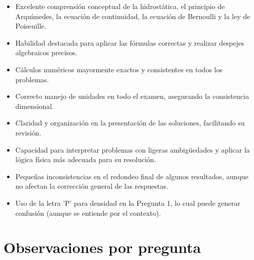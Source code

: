 \documentclass[11pt,a4paper]{article}
\begin{document}
\vspace{4pt}
\begin{minipage}[t]{0.48\linewidth}
  \begin{tcolorbox}[cajaFortaleza, title={Fortalezas}]
\begin{itemize}[leftmargin=1.5em, itemsep=2pt]
  \item Excelente comprensión conceptual de la hidrostática, el principio de Arquímedes, la ecuación de continuidad, la ecuación de Bernoulli y la ley de Poiseuille.
  \item Habilidad destacada para aplicar las fórmulas correctas y realizar despejes algebraicos precisos.
  \item Cálculos numéricos mayormente exactos y consistentes en todos los problemas.
  \item Correcto manejo de unidades en todo el examen, asegurando la consistencia dimensional.
  \item Claridad y organización en la presentación de las soluciones, facilitando su revisión.
  \item Capacidad para interpretar problemas con ligeras ambigüedades y aplicar la lógica física más adecuada para su resolución.
\end{itemize}
  \end{tcolorbox}
\end{minipage}
\hfill
\begin{minipage}[t]{0.48\linewidth}
  \begin{tcolorbox}[cajaMejora, title={Areas de mejora}]
\begin{itemize}[leftmargin=1.5em, itemsep=2pt]
  \item Pequeñas inconsistencias en el redondeo final de algunos resultados, aunque no afectan la corrección general de las respuestas.
  \item Uso de la letra 'P' para densidad en la Pregunta 1, lo cual puede generar confusión (aunque se entiende por el contexto).
\end{itemize}
  \end{tcolorbox}
\end{minipage}

\section*{Observaciones por pregunta}
\end{document}
